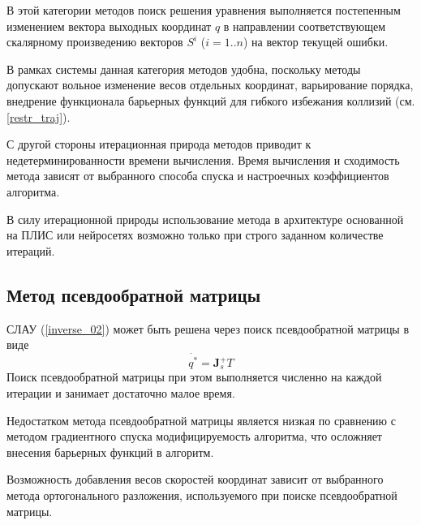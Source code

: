В этой категории методов поиск решения уравнения выполняется постепенным изменением вектора выходных координат $q$ в направлении соответствующем скалярному произведению векторов $S^i$ ($i=1..n$) на вектор текущей ошибки.

В рамках системы данная категория методов удобна, поскольку методы допускают вольное изменение весов отдельных координат, варьирование порядка, внедрение функционала барьерных функций для гибкого избежания коллизий (см. \ref{restr_traj}).

С другой стороны итерационная природа методов приводит к недетерминированности времени вычисления. Время вычисления и сходимость метода зависят от выбранного способа спуска и настроечных коэффициентов алгоритма. 

В силу итерационной природы использование метода в архитектуре основанной на ПЛИС или нейросетях возможно только при строго заданном количестве итераций.

\subsection{Метод псевдообратной матрицы}

СЛАУ (\ref{inverse_02}) может быть решена через поиск псевдообратной матрицы в виде
\begin{equation}\label{inverse_pseudo}
\dot{q^*} = \textbf{J}_s^+ T 
\end{equation}
Поиск псевдообратной матрицы при этом выполняется численно на каждой итерации и занимает достаточно малое время.

Недостатком метода псевдообратной матрицы является низкая по сравнению с методом градиентного спуска модифицируемость алгоритма, что осложняет внесения барьерных функций в алгоритм.

Возможность добавления весов скоростей координат зависит от выбранного метода ортогонального разложения, используемого при поиске псевдообратной матрицы. 
